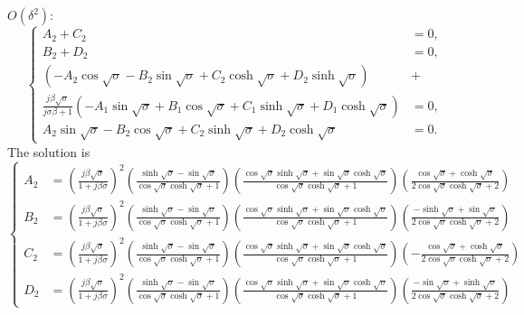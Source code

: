 \documentclass{svjour3}                     %
\begin{document}
\noindent
$O(\delta^2)$:
\begin{equation}
    \left\{\begin{aligned}
        A_2 + C_2 &= 0, \\
        B_2 + D_2 &= 0, \\
        \left( - A_2 \cos{\sqrt{\sigma}} - B_2 \sin{\sqrt{\sigma}} + C_2 \cosh{\sqrt{\sigma}} + D_2 \sinh{\sqrt{\sigma}} \right) &+ \\
        \frac{j \beta \sqrt{\sigma}}{ j\sigma \beta + 1 } \left( - A_1 \sin{\sqrt{\sigma}} + B_1 \cos{\sqrt{\sigma}} + C_1 \sinh{\sqrt{\sigma}} + D_1 \cosh{\sqrt{\sigma}} \right) &= 0, \\
        A_2 \sin{\sqrt{\sigma}} - B_2 \cos{\sqrt{\sigma}} + C_2 \sinh{\sqrt{\sigma}} + D_2 \cosh{\sqrt{\sigma}} &= 0.
    \end{aligned}\right.
\end{equation}
The solution is
\scriptsize
\begin{equation}
    \left\{\begin{aligned}
        A_2 &= \left( \frac{j \beta \sqrt{\sigma }}{1+j \beta \sigma } \right)^2 \left(\frac{ \sinh\sqrt{\sigma } - \sin\sqrt{\sigma }}{\cos\sqrt{\sigma } \cosh\sqrt{\sigma }+1} \right) \left( \frac{\cos\sqrt{\sigma } \sinh\sqrt{\sigma }+\sin\sqrt{\sigma } \cosh\sqrt{\sigma }}{\cos\sqrt{\sigma } \cosh\sqrt{\sigma }+1} \right) \left(\frac{\cos\sqrt{\sigma }+\cosh\sqrt{\sigma }}{2 \cos\sqrt{\sigma }\cosh\sqrt{\sigma }+2} \right) \\
        B_2 &= \left( \frac{j \beta \sqrt{\sigma }}{1+j \beta \sigma } \right)^2 \left(\frac{\sinh\sqrt{\sigma } - \sin\sqrt{\sigma }}{\cos\sqrt{\sigma } \cosh\sqrt{\sigma }+1} \right) \left( \frac{\cos\sqrt{\sigma } \sinh\sqrt{\sigma }+\sin\sqrt{\sigma } \cosh\sqrt{\sigma }}{\cos\sqrt{\sigma } \cosh\sqrt{\sigma }+1} \right) \left( \frac{-\sinh\sqrt{\sigma }+\sin\sqrt{\sigma }}{2 \cos\sqrt{\sigma }\cosh\sqrt{\sigma }+2} \right)\\
        C_2 &= \left( \frac{j \beta \sqrt{\sigma }}{1+j \beta \sigma } \right)^2 \left(\frac{\sinh\sqrt{\sigma } - \sin\sqrt{\sigma }}{\cos\sqrt{\sigma } \cosh\sqrt{\sigma }+1} \right) \left( \frac{\cos\sqrt{\sigma } \sinh\sqrt{\sigma }+\sin\sqrt{\sigma } \cosh\sqrt{\sigma }}{\cos\sqrt{\sigma } \cosh\sqrt{\sigma }+1} \right) \left( -\frac{\cos\sqrt{\sigma }+\cosh\sqrt{\sigma }}{2 \cos\sqrt{\sigma } \cosh\sqrt{\sigma }+2} \right)\\
        D_2 &= \left( \frac{j \beta \sqrt{\sigma }}{1+j \beta \sigma } \right)^2 \left(\frac{\sinh\sqrt{\sigma } - \sin\sqrt{\sigma }}{\cos\sqrt{\sigma } \cosh\sqrt{\sigma }+1} \right) \left( \frac{\cos\sqrt{\sigma } \sinh\sqrt{\sigma }+\sin\sqrt{\sigma } \cosh\sqrt{\sigma }}{\cos\sqrt{\sigma } \cosh\sqrt{\sigma }+1} \right) \left( \frac{-\sin\sqrt{\sigma }+\sinh\sqrt{\sigma }}{2 \cos\sqrt{\sigma }\cosh\sqrt{\sigma }+2} \right)
    \end{aligned}\right.
\end{equation}
\normalsize
\end{document}
